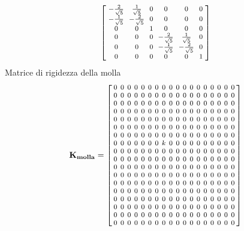 \begin{align*}
{\arraycolsep=3pt\medmuskip=0.8mu\footnotesize
\left[
\begin{array}{cccccc}
 -\frac{2}{\sqrt{5}} & \frac{1}{\sqrt{5}} & 0 & 0 & 0 & 0 \\
 -\frac{1}{\sqrt{5}} & -\frac{2}{\sqrt{5}} & 0 & 0 & 0 & 0 \\
 0 & 0 & 1 & 0 & 0 & 0 \\
 0 & 0 & 0 & -\frac{2}{\sqrt{5}} & \frac{1}{\sqrt{5}} & 0 \\
 0 & 0 & 0 & -\frac{1}{\sqrt{5}} & -\frac{2}{\sqrt{5}} & 0 \\
 0 & 0 & 0 & 0 & 0 & 1 \\
\end{array}
\right]
 }
 \end{align*}
%
Matrice di rigidezza della molla
\[
\mathbf{K_{molla}} =
{\arraycolsep=2pt\medmuskip=0.8mu\footnotesize
\left[
\begin{array}{cccccccccccccccccc}
 0 & 0 & 0 & 0 & 0 & 0 & 0 & 0 & 0 & 0 & 0 & 0 & 0 & 0 & 0 & 0 & 0 & 0 \\
 0 & 0 & 0 & 0 & 0 & 0 & 0 & 0 & 0 & 0 & 0 & 0 & 0 & 0 & 0 & 0 & 0 & 0 \\
 0 & 0 & 0 & 0 & 0 & 0 & 0 & 0 & 0 & 0 & 0 & 0 & 0 & 0 & 0 & 0 & 0 & 0 \\
 0 & 0 & 0 & 0 & 0 & 0 & 0 & 0 & 0 & 0 & 0 & 0 & 0 & 0 & 0 & 0 & 0 & 0 \\
 0 & 0 & 0 & 0 & 0 & 0 & 0 & 0 & 0 & 0 & 0 & 0 & 0 & 0 & 0 & 0 & 0 & 0 \\
 0 & 0 & 0 & 0 & 0 & 0 & 0 & 0 & 0 & 0 & 0 & 0 & 0 & 0 & 0 & 0 & 0 & 0 \\
 0 & 0 & 0 & 0 & 0 & 0 & 0 & 0 & 0 & 0 & 0 & 0 & 0 & 0 & 0 & 0 & 0 & 0 \\
 0 & 0 & 0 & 0 & 0 & 0 & 0 & k & 0 & 0 & 0 & 0 & 0 & 0 & 0 & 0 & 0 & 0 \\
 0 & 0 & 0 & 0 & 0 & 0 & 0 & 0 & 0 & 0 & 0 & 0 & 0 & 0 & 0 & 0 & 0 & 0 \\
 0 & 0 & 0 & 0 & 0 & 0 & 0 & 0 & 0 & 0 & 0 & 0 & 0 & 0 & 0 & 0 & 0 & 0 \\
 0 & 0 & 0 & 0 & 0 & 0 & 0 & 0 & 0 & 0 & 0 & 0 & 0 & 0 & 0 & 0 & 0 & 0 \\
 0 & 0 & 0 & 0 & 0 & 0 & 0 & 0 & 0 & 0 & 0 & 0 & 0 & 0 & 0 & 0 & 0 & 0 \\
 0 & 0 & 0 & 0 & 0 & 0 & 0 & 0 & 0 & 0 & 0 & 0 & 0 & 0 & 0 & 0 & 0 & 0 \\
 0 & 0 & 0 & 0 & 0 & 0 & 0 & 0 & 0 & 0 & 0 & 0 & 0 & 0 & 0 & 0 & 0 & 0 \\
 0 & 0 & 0 & 0 & 0 & 0 & 0 & 0 & 0 & 0 & 0 & 0 & 0 & 0 & 0 & 0 & 0 & 0 \\
 0 & 0 & 0 & 0 & 0 & 0 & 0 & 0 & 0 & 0 & 0 & 0 & 0 & 0 & 0 & 0 & 0 & 0 \\
 0 & 0 & 0 & 0 & 0 & 0 & 0 & 0 & 0 & 0 & 0 & 0 & 0 & 0 & 0 & 0 & 0 & 0 \\
 0 & 0 & 0 & 0 & 0 & 0 & 0 & 0 & 0 & 0 & 0 & 0 & 0 & 0 & 0 & 0 & 0 & 0 \\
\end{array}
\right]
}
\]
